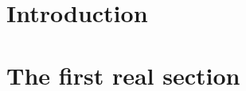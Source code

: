 \documentclass[twoside]{article}
\begin{document}
\section{Introduction}
\label{sec:introduction}
\thispagestyle{plain}

\lipsum[1-8]

\section{The first real section}
\label{sec:first-real-section}

\lipsum[1-8]
\end{document}
